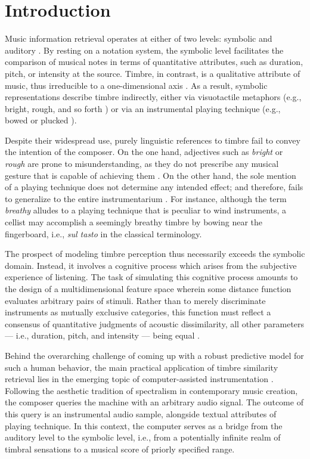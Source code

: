 \documentclass{bmcart}
\makeatletter
\newcommand*{\eg}{e.g.,\@\xspace}
\newcommand*{\ie}{i.e.,\@\xspace}
\makeatother
\begin{document}
\section*{Introduction}
\label{sec:intro}

Music information retrieval operates at either of two levels: symbolic and auditory \cite{downie2003mir}.
By resting on a notation system, the symbolic level facilitates the comparison of musical notes in terms of quantitative attributes, such as duration, pitch, or intensity at the source.
Timbre, in contrast, is a qualitative attribute of music, thus irreducible to a one-dimensional axis \cite{siedenburg2019chapter}.
As a result, symbolic representations describe timbre indirectly, either via visuotactile metaphors (\eg{} bright, rough, and so forth \cite{faure1996icmpc}) or via an instrumental playing technique (\eg{} bowed or plucked \cite{kostka2016book}).

Despite their widespread use, purely linguistic references to timbre fail to convey the intention of the composer.
On the one hand, adjectives such as \emph{bright} or \emph{rough} are prone to misunderstanding, as they do not prescribe any musical gesture that is capable of achieving them \cite{antoine2018isma}.
On the other hand, the sole mention of a playing technique does not determine any intended effect; and therefore, fails to generalize to the entire instrumentarium \cite{kolozali2011ismir}.
For instance, although the term \emph{breathy} alludes to a playing technique that is peculiar to wind instruments, a cellist may accomplish a seemingly breathy timbre by bowing near the fingerboard, i.e., \emph{sul tasto} in the classical terminology.

The prospect of modeling timbre perception thus necessarily exceeds the symbolic domain.
Instead, it involves a cognitive process which arises from the subjective experience of listening. %
The task of simulating this cognitive process amounts to the design of a multidimensional feature space wherein some distance function evaluates arbitrary pairs of stimuli.
Rather than to merely discriminate instruments as mutually exclusive categories, this function must reflect a consensus of quantitative judgments of acoustic dissimilarity, all other parameters --- \ie{} duration, pitch, and intensity --- being equal \cite{thoret2018jasa}.

Behind the overarching challenge of coming up with a robust predictive model for such a human behavior, the main practical application of timbre similarity retrieval lies in the emerging topic of computer-assisted instrumentation \cite{maresz2013cmr}.
Following the aesthetic tradition of spectralism in contemporary music creation, the composer queries the machine with an arbitrary audio signal.
The outcome of this query is an instrumental audio sample, alongside textual attributes of playing technique.
In this context, the computer serves as a bridge from the auditory level to the symbolic level, \ie{} from a potentially infinite realm of timbral sensations to a musical score of priorly specified range.
\end{document}

